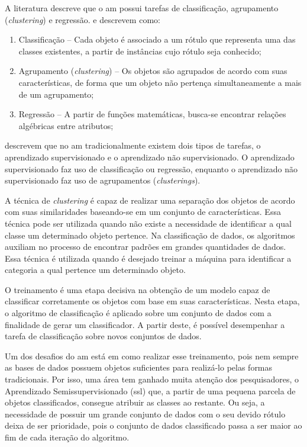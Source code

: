     A literatura descreve que o \ac{am} possui tarefas de classificação, agrupamento (\textit{clustering}) e regressão.  e  descrevem como:
    \begin{enumerate}[label=\roman*.]
        \item Classificação {--} Cada objeto é associado a um rótulo que representa uma das classes existentes, a partir de instâncias cujo rótulo seja conhecido;
        \item Agrupamento (\textit{clustering}) {--} Os objetos são agrupados de acordo com suas características, de forma que um objeto não pertença simultaneamente a mais de um agrupamento;
        \item Regressão {--} A partir de funções matemáticas, busca\hyp{se} encontrar relações algébricas entre atributos;
    \end{enumerate}
    
     descrevem que no \ac{am} tradicionalmente existem dois tipos de tarefas, o aprendizado supervisionado e o aprendizado não supervisionado. O aprendizado supervisionado faz uso de classificação ou regressão, enquanto o aprendizado não supervisionado faz uso de agrupamentos (\textit{clusterings}).
    
    
    A técnica de \textit{clustering} é capaz de realizar uma separação dos objetos de acordo com suas similaridades baseando\hyp{se} em um conjunto de características. Essa técnica pode ser utilizada quando não existe a necessidade de identificar a qual classe um determinado objeto pertence. Na classificação de dados, os algoritmos auxiliam no processo de encontrar padrões em grandes quantidades de dados. Essa técnica é utilizada quando é desejado treinar a máquina para identificar a categoria a qual pertence um determinado objeto.
    
    O treinamento é uma etapa decisiva na obtenção de um modelo capaz de classificar corretamente os objetos com base em suas características. Nesta etapa, o algoritmo de classificação é aplicado sobre um conjunto de dados com a finalidade de gerar um classificador. A partir deste, é possível desempenhar a tarefa de classificação sobre novos conjuntos de dados.
    
    Um dos desafios do \ac{am} está em como realizar esse treinamento, pois nem sempre as bases de dados possuem objetos suficientes para realizá\hyp{lo} pelas formas tradicionais. Por isso, uma área tem ganhado muita atenção dos pesquisadores, o Aprendizado Semissupervisionado (\ac{ssl}) que, a partir de uma pequena parcela de objetos classificados, consegue atribuir as classes ao restante. Ou seja, a necessidade de possuir um grande conjunto de dados com o seu devido rótulo deixa de ser prioridade, pois o conjunto de dados classificado passa a ser maior ao fim de cada iteração do algoritmo.
    

